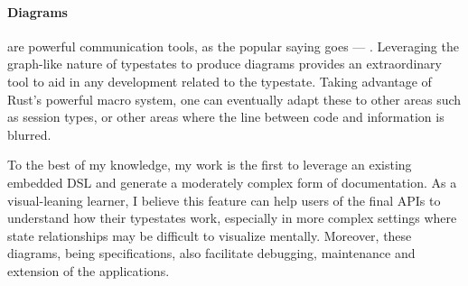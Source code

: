 \paragraph{Diagrams} are powerful communication tools, as the popular saying goes --- .
Leveraging the graph-like nature of typestates to produce diagrams
provides an extraordinary tool to aid in any development related to the typestate.
Taking advantage of Rust's powerful macro system, one can eventually adapt these to other areas such as session types,
or other areas where the line between code and information is blurred.

To the best of my knowledge, my work is the first to leverage an existing embedded DSL and generate a moderately complex form of documentation.
As a visual-leaning learner, I believe this feature can help users of the final APIs to understand how their typestates work,
especially in more complex settings where state relationships may be difficult to visualize mentally.
Moreover, these diagrams, being specifications, also facilitate debugging, maintenance and extension of the applications.
